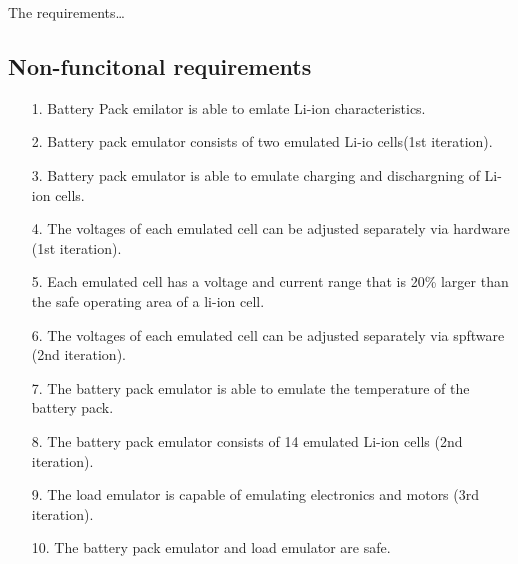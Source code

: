 \IEEEPARstart
{T}{he} requirements\dots

\subsection{Non-funcitonal requirements}
\begin{enumerate}
    \item[1.] Battery Pack emilator is able to emlate Li-ion characteristics.
    \item[2.] Battery pack emulator consists of two emulated Li-io 
    cells(1st iteration).
    \item[3.] Battery pack emulator is able to emulate charging and dischargning of
    Li-ion cells.
    \item[4.] The voltages of each emulated cell can be adjusted separately 
    via hardware (1st iteration).
    \item[5.] Each emulated cell has a voltage and current range that is 20\%
    larger than the safe operating area of a li-ion cell.
    \item[6.] The voltages of each emulated cell can be adjusted separately 
    via spftware (2nd iteration).
    \item[7.] The battery pack emulator is able to emulate the temperature of 
    the battery pack.
    \item[8.] The battery pack emulator consists of 14 emulated Li-ion 
    cells (2nd iteration). 
    \item[9.] The load emulator is capable of emulating electronics and 
    motors (3rd iteration).
    \item[10.] The battery pack emulator and load emulator are safe. 
  \end{enumerate}

